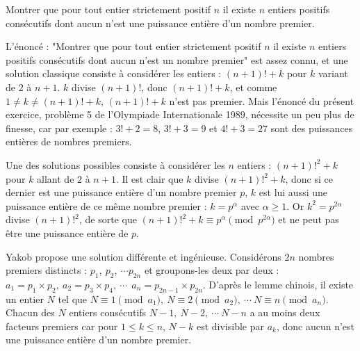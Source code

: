 \begin{exo}

\medskip

Montrer que pour tout entier strictement positif $n$ il existe $n$ entiers positifs consécutifs dont aucun n'est une puissance entière d'un nombre premier. 

\end{exo}

\bigskip

\begin{sol}

\medskip

L'énoncé : "Montrer que pour tout entier strictement positif $n$ il existe $n$ entiers positifs consécutifs dont aucun n'est un nombre premier" est assez connu, et une solution classique consiste à considérer les entiers : $(n+1)! +k$ pour $k$ variant de $2$ à $n+1$. $k$ divise $(n+1)!$, donc $(n+1)! + k$, et comme $1 \neq k \neq (n+1)!+k$, $(n+1)! + k$ n'est pas premier. Mais l'énoncé du présent exercice, problème 5 de l'Olympiade Internationale 1989, nécessite un peu plus de finesse, car par exemple : $3! + 2 = 8$, $3! + 3 = 9$ et $4! + 3 = 27$ sont des puissances entières de nombres premiers. 

Une des solutions possibles consiste à considérer les $n$ entiers : $(n+1)!^2 + k$ pour $k$ allant de $2$ à $n+1$. Il est clair que $k$ divise $(n+1)!^2 + k$, donc si ce dernier est une puissance entière d'un nombre premier $p$, $k$ est lui aussi une puissance entière de ce même nombre premier : $k = p^{\alpha}$ avec $\alpha \geq 1$. Or $k^2 = p^{2\alpha}$ divise $(n+1)!^2$, de sorte que $(n+1)!^2 + k \equiv p^{\alpha} \pmod{p^{2\alpha}}$ et ne peut pas être une puissance entière de $p$. 

Yakob propose une solution différente et ingénieuse. Considérons $2n$ nombres premiers distincts : $p_1, \ p_2, \ \cdots p_{2n}$ et groupons-les deux par deux : $a_1 = p_1 \times p_2, \ a_2 = p_3 \times p_4, \ \cdots \ \ a_n = p_{2n-1} \times p_{2n}$. D'après le lemme chinois, il existe un entier $N$ tel que $N \equiv 1 \pmod{a_1}, \ N \equiv 2 \pmod{a_2}, \ \cdots \ N \equiv n \pmod{a_n}$. Chacun des $N$ entiers consécutifs $N-1, \ N-2, \ \cdots \ N-n$ a au moins deux facteurs premiers car pour $1 \leq k \leq n$, $N - k$ est divisible par $a_k$, donc aucun n'est une puissance entière d'un nombre premier.


\end{sol}

